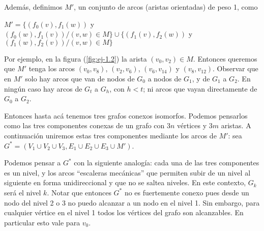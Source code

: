 Además, definimos $M'$, un conjunto de arcos (aristas orientadas) de peso 1, como 

{\footnotesize$M'= \{(f_0(v), f_1(w))$ y $(f_0(w), f_1(v)) / (v,w)\in M\} \cup \{(f_1(v), f_2(w)) $ y $(f_1(w), f_2(v))/ (v,w)\in M\}$}

Por ejemplo, en la figura (\ref{fig:ej-1.2}) la arista $(v_0, v_2)\in M$. Entonces queremos que $M'$ tenga los arcos $(v_0, v_8)$, $(v_2, v_6)$, $(v_6, v_{14})$ y $(v_8, v_{12})$.
Observar que en $M'$ solo hay arcos que van de nodos de $G_0$ a nodos de $G_1$, y de $G_1$ a $G_2$. En ningún caso hay arcos de $G_t$ a $G_h$, con $h<t$; ni arcos que vayan directamente de $G_0$ a $G_2$.

Entonces hasta acá tenemos tres grafos conexos isomorfos. Podemos pensarlos como las tres componentes conexas de un grafo con $3n$ vértices y $3m$ aristas. A continuación uniremos estas tres componentes mediante los arcos de $M'$: sea $G^*=(V_1\cup V_2\cup V_3, E_1\cup E_2\cup E_3 \cup M')$. 

Podemos pensar a $G^*$ con la siguiente analogía: cada una de las tres componentes es un nivel, y los arcos ``escaleras mecánicas'' que permiten subir de un nivel al siguiente en forma unidireccional y que no se saltea niveles. En este contexto, $G_k$ será el nivel $k$. Notar que entonces $G^*$ no es fuertemente conexo pues desde un nodo del nivel 2 o 3 no puedo alcanzar a un nodo en el nivel 1. Sin embargo, para cualquier vértice en el nivel 1 todos los vértices del grafo son alcanzables. En particular esto vale para $v_0$.  

\pgfmathsetmacro{}
\pgfmathsetmacro{}
\pgfmathsinandcos\sint\cost{\angFuite}

